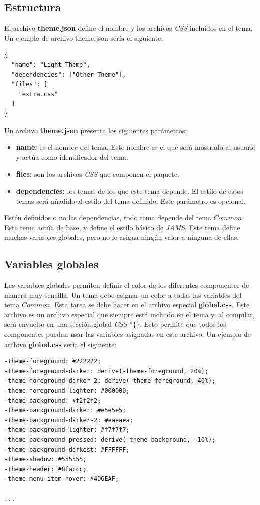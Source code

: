 \subsection{Estructura}\label{subsec:estructura}

El archivo \textbf{theme.json} define el nombre y los archivos
\textit{CSS} incluidos en el tema.
Un ejemplo de archivo theme.json sería el siguiente:
\begin{lstlisting}[frame=single,label={lst:theme.json}]
{
  "name": "Light Theme",
  "dependencies": ["Other Theme"],
  "files": [
    "extra.css"
  ]
}
\end{lstlisting}

\noindent Un archivo \textbf{theme.json} presenta los siguientes parámetros:
\begin{itemize}
    \item \textbf{name:} es el nombre del tema.
    Este nombre es el que será mostrado al usuario
    y actúa como identificador del tema.
    \item \textbf{files:} son los archivos \textit{CSS} que componen el paquete.
    \item \textbf{dependencies:} los temas de los que este tema depende.
    El estilo de estos temas será añadido al estilo del tema definido.
    Este parámetro es opcional.
\end{itemize}

\noindent Estén definidos o no las dependencias,
todo tema depende del tema $Common$.
Este tema actúa de base, y define el estilo básico de \textit{JAMS}.
Este tema define muchas variables globales, pero no le asigna ningún
valor a ninguna de ellas.

\subsection{Variables globales}\label{subsec:variables-globales}

Las variables globales permiten definir el color de los diferentes
componentes de manera muy sencilla.
Un tema debe asignar un color a todas las variables del tema $Common$.
Esta tarea se debe hacer en el archivo especial \textbf{global.css}.
Este archivo es un archivo especial que siempre está incluido en el tema y,
al compilar, será envuelto en una sección global \textit{CSS} $*\{ \}$.
Esto permite que todos los componentes puedan usar
las variables asignadas en este archivo.
Un ejemplo de archivo \textbf{global.css} sería el siguiente:

\begin{lstlisting}[frame=single,label={lst:global.css}]
-theme-foreground: #222222;
-theme-foreground-darker: derive(-theme-foreground, 20%);
-theme-foreground-darker-2: derive(-theme-foreground, 40%);
-theme-foreground-lighter: #000000;
-theme-background: #f2f2f2;
-theme-background-darker: #e5e5e5;
-theme-background-darker-2: #eaeaea;
-theme-background-lighter: #f7f7f7;
-theme-background-pressed: derive(-theme-background, -10%);
-theme-background-darkest: #FFFFFF;
-theme-shadow: #555555;
-theme-header: #8faccc;
-theme-menu-item-hover: #4D6EAF;

...
\end{lstlisting}

